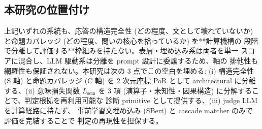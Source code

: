 \subsection{本研究の位置付け}
\label{sec:rw:positioning}

上記いずれの系統も、応答の構造完全性 (どの程度、文として壊れていないか)
と命題カバレッジ (どの程度、問いの核心を拾っているか) を**計算機構の
段階で分離して評価する**枠組みを持たない。表層・埋め込み系は両者を単一
スコアに混合し、LLM 駆動系は分離を prompt 設計に委譲するため、軸の
排他性も網羅性も保証されない。本研究は次の 3 点でこの空白を埋める:
(i) 構造完全性 (S 軸) と命題カバレッジ (C 軸) を 2 次元座標 PoR として
architectural に分離する、(ii) 意味損失関数 $L_{\mathrm{sem}}$ を
3 項 (演算子・未知性・因果構造) に分解することで、判定根拠を再利用可能な
診断 primitive として提供する、(iii) judge LLM を計算経路に持たず、
事前学習文埋め込み (SBert) と cascade matcher のみで評価を完結することで
判定の再現性を担保する。
